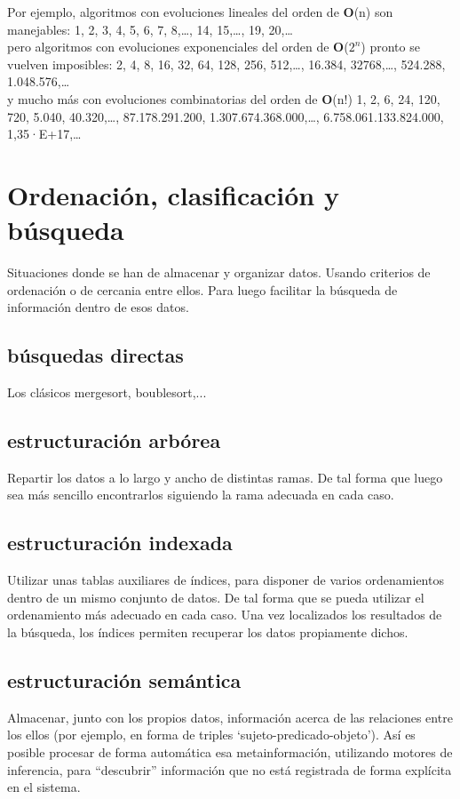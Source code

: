 \documentclass[spanish,12pt,a4paper,final,oneside]{book}
\begin{document}
Por ejemplo, algoritmos con evoluciones lineales del orden de \textbf{O}(n) son manejables: 1, 2, 3, 4, 5, 6, 7, 8,\ldots, 14, 15,\ldots, 19, 20,\ldots 
\\pero algoritmos con evoluciones exponenciales del orden de \textbf{O}($2^n$) pronto se vuelven  imposibles: 2, 4, 8, 16, 32, 64, 128, 256, 512,\ldots, 16.384, 32768,\ldots, 524.288, 1.048.576,\ldots 
\\y mucho más con evoluciones combinatorias del orden de \textbf{O}(n!)  1, 2, 6, 24, 120, 720, 5.040, 40.320,\ldots, 87.178.291.200, 1.307.674.368.000,\ldots, 6.758.061.133.824.000, 1,35·E+17,\ldots

\section{Ordenación, clasificación y búsqueda}
Situaciones donde se han de almacenar y organizar datos.  Usando criterios de ordenación o de cercania entre ellos. Para luego facilitar la búsqueda de información dentro de esos datos.

\subsection{búsquedas directas}
Los clásicos mergesort, boublesort,...

\subsection{estructuración arbórea}
Repartir los datos a lo largo y ancho de distintas ramas. De tal forma que luego sea más sencillo encontrarlos siguiendo la rama adecuada en cada caso.

\subsection{estructuración indexada}
Utilizar unas tablas auxiliares de índices, para disponer de varios ordenamientos dentro de un mismo conjunto de datos. De tal forma que se pueda utilizar el ordenamiento más adecuado en cada caso. Una vez localizados los resultados de la búsqueda, los índices permiten recuperar los datos propiamente dichos.

\subsection{estructuración semántica}
Almacenar, junto con los propios datos, información acerca de las relaciones entre los ellos (por ejemplo, en forma de triples `sujeto-predicado-objeto'). Así es posible procesar de forma automática esa metainformación, utilizando motores de inferencia, para ``descubrir'' información que no está registrada de forma explícita en el sistema.
\end{document}
